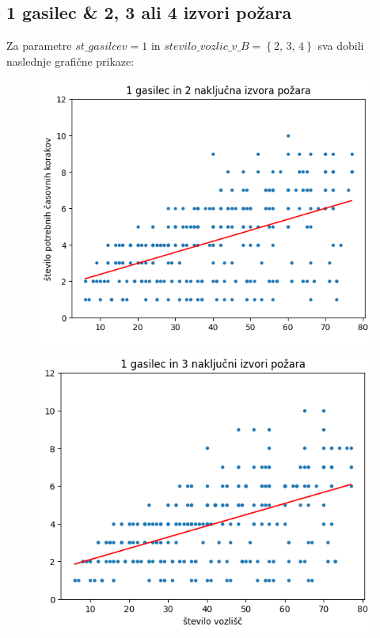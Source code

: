 \documentclass[a4paper, 12pt]{article}
\begin{document}
\pagebreak

\subsection{1 gasilec \& 2, 3 ali 4 izvori požara}

Za parametre $st\_gasilcev = 1$ in $stevilo\_vozlic\_v\_B = \left\{ 2, \, 3, \, 4 \right\}$ sva dobili
naslednje grafične prikaze:

\begin{figure}[!htb]
      \includegraphics[width=\linewidth]{plot12}
    \endminipage\hfill
      \includegraphics[width=\linewidth]{plot13}

\end{figure}
\end{document}
